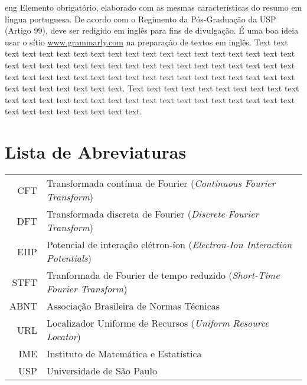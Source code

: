 \begin{resumo}{eng}
Elemento obrigatório, elaborado com as mesmas características do resumo em
língua portuguesa. De acordo com o Regimento da Pós-Graduação da USP (Artigo
99), deve ser redigido em inglês para fins de divulgação. É uma boa ideia usar
o sítio \url{www.grammarly.com} na preparação de textos em inglês.
Text text text text text text text text text text text text text text text text
text text text text text text text text text text text text text text text text
text text text text text text text text text text text text text text text text
text text text text text text text text text text text text.
Text text text text text text text text text text text text text text text text
text text text text text text text text text text text text text text text text
text text text.
\end{resumo}



\chapter*{Lista de Abreviaturas}
\begin{tabular}{rl}
         CFT         & Transformada contínua de Fourier (\emph{Continuous Fourier Transform})\\
         DFT         & Transformada discreta de Fourier (\emph{Discrete Fourier Transform})\\
        EIIP         & Potencial de interação elétron-íon (\emph{Electron-Ion Interaction Potentials})\\
        STFT         & Tranformada de Fourier de tempo reduzido (\emph{Short-Time Fourier Transform})\\
	ABNT         & Associação Brasileira de Normas Técnicas\\
	URL          & Localizador Uniforme de Recursos (\emph{Uniform Resource Locator})\\
	IME          & Instituto de Matemática e Estatística\\
	USP          & Universidade de São Paulo
\end{tabular}


